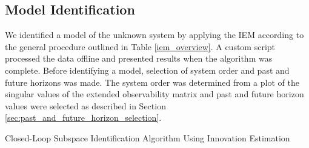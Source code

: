 \subsection{Model Identification}
We identified a model of the unknown system by applying the IEM according to the general procedure outlined in Table \ref{iem_overview}. A custom \matlab script processed the data offline and presented results when the algorithm was complete. Before identifying a model, selection of system order and past and future horizons was made. The system order was determined from a plot of the singular values of the extended observability matrix and past and future horizon values were selected as described in Section \ref{sec:past_and_future_horizon_selection}.

\begin{table}[!htb]
\centering
\caption{Closed-Loop Subspace Identification Algorithm Using Innovation Estimation}%
\end{table}
